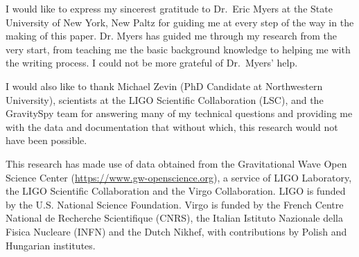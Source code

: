 \documentclass[reprint,
letterpaper,
 amsmath,amssymb,
 aps,
]{revtex4-2}
\begin{document}
\begin{acknowledgments}
I would like to express my sincerest gratitude to Dr.\ Eric Myers at the State University of New York, New Paltz for guiding me at every step of the way in the making of this paper. Dr. Myers has guided me through my research from the very start, from teaching me the basic background knowledge to helping me with the writing process. I could not be more grateful of Dr.\ Myers' help.

I would also like to thank Michael Zevin (PhD Candidate at Northwestern University), scientists at the LIGO Scientific Collaboration (LSC), and the GravitySpy team for answering many of my technical questions and providing me with the data and documentation that without which, this research would not have been possible. 

This research has made use of data obtained from the Gravitational Wave Open Science Center (\url{https://www.gw-openscience.org}), a service of LIGO Laboratory, the LIGO Scientific Collaboration and the Virgo Collaboration. LIGO is funded by the U.S. National Science Foundation. Virgo is funded by the French Centre National de Recherche Scientifique (CNRS), the Italian Istituto Nazionale della Fisica Nucleare (INFN) and the Dutch Nikhef, with contributions by Polish and Hungarian institutes.
\end{acknowledgments}



\end{document}
